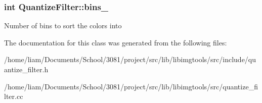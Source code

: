 \subsubsection[{\texorpdfstring{bins\+\_\+}{bins_}}]{\setlength{\rightskip}{0pt plus 5cm}int Quantize\+Filter\+::bins\+\_\+\hspace{0.3cm}{\ttfamily [private]}}\hypertarget{classQuantizeFilter_aaa5f146423a5263ec3690098917bd5dc}{}\label{classQuantizeFilter_aaa5f146423a5263ec3690098917bd5dc}
Number of bins to sort the colors into 

The documentation for this class was generated from the following files\+:\begin{DoxyCompactItemize}
\item 
/home/liam/\+Documents/\+School/3081/project/src/lib/libimgtools/src/include/quantize\+\_\+filter.\+h\item 
/home/liam/\+Documents/\+School/3081/project/src/lib/libimgtools/src/quantize\+\_\+filter.\+cc\end{DoxyCompactItemize}
